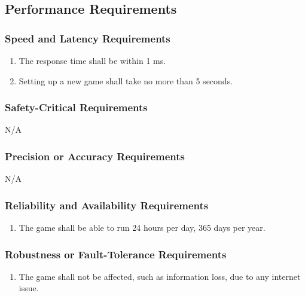 \documentclass[12pt, titlepage]{article}
\begin{document}
\subsection{Performance Requirements}
\label{sub:performance_requirements}

\subsubsection{Speed and Latency Requirements}
\label{ssub:speed_and_latency_requirements}
\begin{enumerate}[{PR}1. ]
        \item The response time shall be within 1 ms.
        \item Setting up a new game shall take no more than 5 seconds.
\end{enumerate}

\subsubsection{Safety-Critical Requirements}
\label{ssub:safety_critical_requirements}
N/A

\subsubsection{Precision or Accuracy Requirements}
\label{ssub:precision_or_accuracy_requirements}
N/A

\subsubsection{Reliability and Availability Requirements}
\label{ssub:reliability_and_availability_requirements}
\begin{enumerate}[start=3,label={ PR\arabic*.}]
        \item The game shall be able to run 24 hours per day, 365 days per year.
\end{enumerate}

\subsubsection{Robustness or Fault-Tolerance Requirements}
\label{ssub:robustness_or_fault_tolerance_requirements}
\begin{enumerate}[start=4,label={ PR\arabic*.}]
        \item The game shall not be affected, such as information loss, due to any internet issue.
\end{enumerate}
\end{document}
